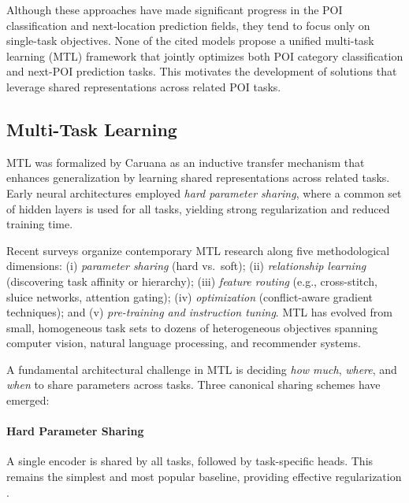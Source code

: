 

Although these approaches have made significant progress in the POI classification and next-location prediction fields, they tend to focus only on single-task objectives. None of the cited models propose a unified multi-task learning (MTL) framework that jointly optimizes both POI category classification and next-POI prediction tasks. This motivates the development of solutions that leverage shared representations across related POI tasks.


\subsection{Multi-Task Learning}\label{sec:mtl}

MTL was formalized by Caruana \cite{caruana1997multitask} as an inductive transfer mechanism that enhances generalization by learning shared representations across related tasks. Early neural architectures employed \emph{hard parameter sharing}, where a common set of hidden layers is used for all tasks, yielding strong regularization and reduced training time.

Recent surveys \cite{yu2024survey,zhang2021survey} organize contemporary MTL research along five methodological dimensions: (i) \textit{parameter sharing} (hard vs.\ soft); (ii) \textit{relationship learning} (discovering task affinity or hierarchy); (iii) \textit{feature routing} (e.g., cross-stitch, sluice networks, attention gating); (iv) \textit{optimization} (conflict-aware gradient techniques); and (v) \textit{pre-training and instruction tuning}. MTL has evolved from small, homogeneous task sets to dozens of heterogeneous objectives spanning computer vision, natural language processing, and recommender systems.

A fundamental architectural challenge in MTL is deciding \emph{how much}, \emph{where}, and \emph{when} to share parameters across tasks. Three canonical sharing schemes have emerged:

\paragraph*{Hard Parameter Sharing}  
A single encoder is shared by all tasks, followed by task-specific heads. This remains the simplest and most popular baseline, providing effective regularization \cite{caruana1997multitask}.
